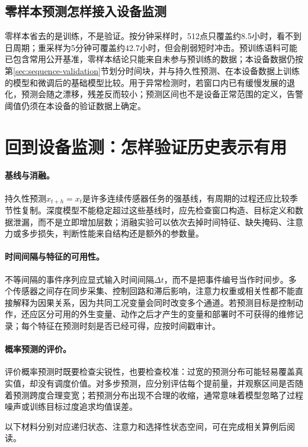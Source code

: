 \subsection{零样本预测怎样接入设备监测}
零样本省去的是训练，不是验证。按分钟采样时，512点只覆盖约8.5小时，看不到日周期；重采样为5分钟可覆盖约42.7小时，但会削弱短时冲击。预训练语料可能已包含常用公开基准，零样本结论只能来自未参与预训练的数据；本设备数据仍按第\ref{sec:sequence-validation}节划分时间块，并与持久性预测、在本设备数据上训练的模型和微调后的基础模型比较。用于异常检测时，若窗口内已有缓慢发展的退化，预测会随之漂移，残差反而较小；预测区间也不是设备正常范围的定义，告警阈值仍须在本设备的验证数据上确定。

\section{回到设备监测：怎样验证历史表示有用}
\paragraph{基线与消融。}
持久性预测$\hat x_{t+h}=x_t$是许多连续传感器任务的强基线，有周期的过程还应比较季节性复制。深度模型不能稳定超过这些基线时，应先检查窗口构造、目标定义和数据泄漏，而不是立即增加层数；消融实验可以依次去掉时间特征、缺失掩码、注意力或多步损失，判断性能来自结构还是额外的参数量。

\paragraph{时间间隔与特征的可用性。}
不等间隔的事件序列应显式输入时间间隔$\Delta t$，而不是把事件编号当作时间步。多个传感器之间存在同步采集、控制回路和滞后影响，注意力权重或相关性都不能直接解释为因果关系，因为共同工况变量会同时改变多个通道。若预测目标是控制动作，还应区分可用的外生变量、动作之后才产生的变量和部署时不可获得的维修记录；每个特征在预测时刻是否已经可得，应按时间戳审计。

\paragraph{概率预测的评价。}
评价概率预测时既要检查尖锐性，也要检查校准：过宽的预测分布可能轻易覆盖真实值，却没有调度价值。对多步预测，应分别评估每个提前量，并观察区间是否随着预测跨度合理变宽；若预测分布出现不合理的收缩，通常意味着模型忽略了过程噪声或训练目标过度追求均值误差。

以下材料分别对应递归状态、注意力和选择性状态空间，可在完成相关算例后阅读。
